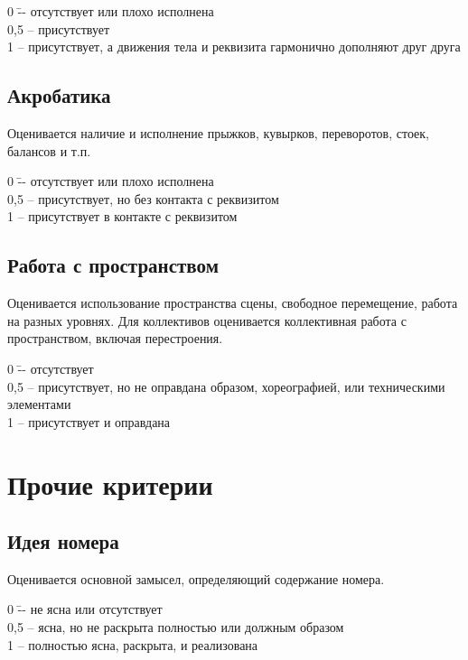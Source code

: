 \documentclass[12pt]{article}
\begin{document}
\begin{tabbing}
0\hspace{0.8em}  \= -- отсутствует или плохо исполнена\\
0,5 \>-- присутствует\\
1 \>-- присутствует, а движения тела и реквизита гармонично дополняют друг друга
\end{tabbing}


\subsection{Акробатика} 
Оценивается наличие и исполнение прыжков, кувырков, переворотов, стоек, балансов и т.п.

\begin{tabbing}
0\hspace{0.8em}  \= -- отсутствует или плохо исполнена\\
0,5 \>-- присутствует, но без контакта с реквизитом\\
1 \>-- присутствует в контакте с реквизитом
\end{tabbing}


\subsection{Работа с пространством} 
Оценивается использование пространства сцены, свободное перемещение, работа на разных уровнях. Для коллективов оценивается коллективная работа с пространством, включая перестроения.

\begin{tabbing}
0\hspace{0.8em}  \= -- отсутствует\\
0,5 \>-- присутствует, но не оправдана образом, хореографией, или техническими элементами\\
1 \>-- присутствует и оправдана
\end{tabbing}


\section{Прочие критерии}


\subsection{Идея номера}
Оценивается основной замысел, определяющий содержание номера.

\begin{tabbing}
0\hspace{0.8em} \=-- не ясна или отсутствует\\
0,5 \>-- ясна, но не раскрыта полностью или должным образом\\
1 \>-- полностью ясна, раскрыта, и реализована
\end{tabbing}
\end{document}
